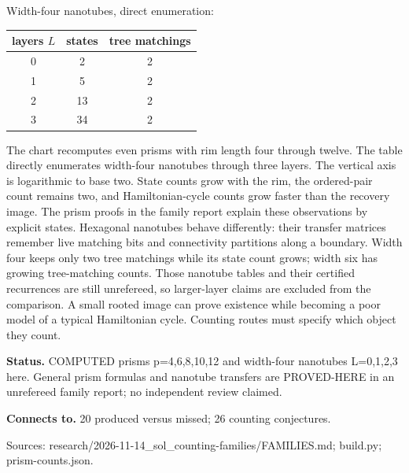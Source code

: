 \documentclass[10pt,a4paper]{amsart}
\begin{document}
\begin{center}
\begin{minipage}{.86\textwidth}
\par\bigskip Width-four nanotubes, direct enumeration:\par \begin{tabular}{ccc}\hline
layers $L$ & states & tree matchings\\\hline
0 & 2 & 2\\
1 & 5 & 2\\
2 & 13 & 2\\
3 & 34 & 2\\
\hline\end{tabular}
\end{minipage}\end{center}
The chart recomputes even prisms with rim length four through twelve. The table directly enumerates width-four nanotubes through three layers. The vertical axis is logarithmic to base two. State counts grow with the rim, the ordered-pair count remains two, and Hamiltonian-cycle counts grow faster than the recovery image. The prism proofs in the family report explain these observations by explicit states. Hexagonal nanotubes behave differently: their transfer matrices remember live matching bits and connectivity partitions along a boundary. Width four keeps only two tree matchings while its state count grows; width six has growing tree-matching counts. Those nanotube tables and their certified recurrences are still unrefereed, so larger-layer claims are excluded from the comparison. A small rooted image can prove existence while becoming a poor model of a typical Hamiltonian cycle. Counting routes must specify which object they count.

\textbf{Status.} COMPUTED prisms p=4,6,8,10,12 and width-four nanotubes L=0,1,2,3 here. General prism formulas and nanotube transfers are PROVED-HERE in an unrefereed family report; no independent review claimed.

\textbf{Connects to.} 20 produced versus missed; 26 counting conjectures.

{\footnotesize\raggedright Sources: research/\allowbreak{}2026-11-14\_sol\_counting-families/\allowbreak{}FAMILIES.md;\allowbreak{} build.py;\allowbreak{} prism-counts.json.\par}
\end{document}
